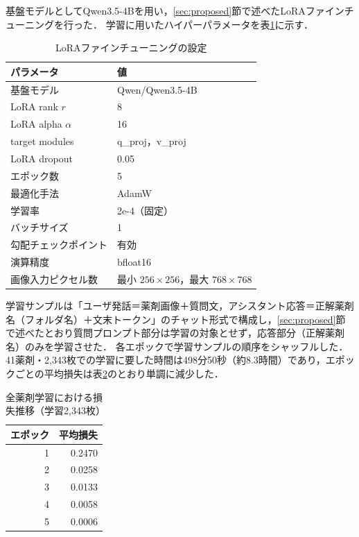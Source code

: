 \documentclass[dvipdfmx]{jsarticle}
\begin{document}
基盤モデルとしてQwen3.5-4Bを用い，\ref{sec:proposed}節で述べたLoRAファインチューニングを行った．
学習に用いたハイパーパラメータを表\ref{tab:lora_config}に示す．

\begin{table}[htbp]
\centering
\caption{LoRAファインチューニングの設定}
\label{tab:lora_config}
\begin{tabular}{ll}
\hline
パラメータ & 値 \\
\hline
基盤モデル & Qwen/Qwen3.5-4B \\
LoRA rank $r$ & 8 \\
LoRA alpha $\alpha$ & 16 \\
target modules & q\_proj，v\_proj \\
LoRA dropout & 0.05 \\
エポック数 & 5 \\
最適化手法 & AdamW \\
学習率 & 2e-4（固定） \\
バッチサイズ & 1 \\
勾配チェックポイント & 有効 \\
演算精度 & bfloat16 \\
画像入力ピクセル数 & 最小 $256 \times 256$，最大 $768 \times 768$ \\
\hline
\end{tabular}
\end{table}

学習サンプルは「ユーザ発話＝薬剤画像＋質問文，アシスタント応答＝正解薬剤名（フォルダ名）＋文末トークン」のチャット形式で構成し，\ref{sec:proposed}節で述べたとおり質問プロンプト部分は学習の対象とせず，応答部分（正解薬剤名）のみを学習させた．
各エポックで学習サンプルの順序をシャッフルした．
41薬剤・2,343枚での学習に要した時間は498分50秒（約8.3時間）であり，エポックごとの平均損失は表\ref{tab:loss_all}のとおり単調に減少した．

\begin{table}[htbp]
\centering
\caption{全薬剤学習における損失推移（学習2,343枚）}
\label{tab:loss_all}
\begin{tabular}{rr}
\hline
エポック & 平均損失 \\
\hline
1 & 0.2470 \\
2 & 0.0258 \\
3 & 0.0133 \\
4 & 0.0058 \\
5 & 0.0006 \\
\hline
\end{tabular}
\end{table}
\end{document}
